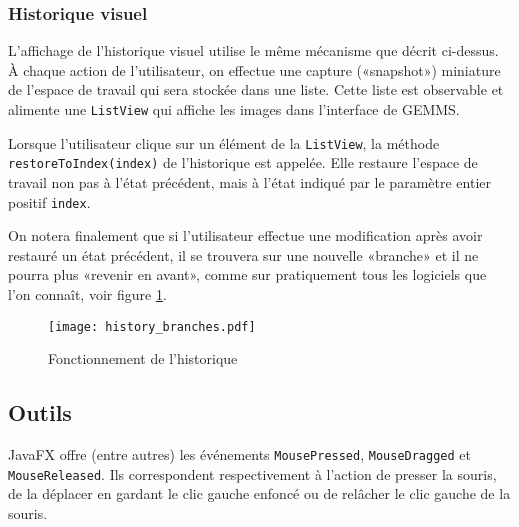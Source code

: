 \subsubsection{Historique visuel}
L'affichage de l'historique visuel utilise le même mécanisme que décrit ci-dessus. À chaque action de l'utilisateur, on effectue une capture («snapshot») miniature de l'espace de travail qui sera stockée dans une liste. Cette liste est observable et alimente une \texttt{ListView} qui affiche les images dans l'interface de GEMMS.

Lorsque l'utilisateur clique sur un élément de la \texttt{ListView}, la méthode \texttt{restoreToIndex(index)} de l'historique est appelée. Elle restaure l'espace de travail non pas à l'état précédent, mais à l'état indiqué par le paramètre entier positif \texttt{index}.

On notera finalement que si l'utilisateur effectue une modification après avoir restauré un état précédent, il se trouvera sur une nouvelle «branche» et il ne pourra plus «revenir en avant», comme sur pratiquement tous les logiciels que l'on connaît, voir figure \ref{fig:hist_branches}.

\begin{figure}[!ht]
    \caption{Fonctionnement de l'historique}
    \centering
    \texttt{[image: history\_branches.pdf]}
    \label{fig:hist_branches}
\end{figure}

\subsection{Outils}
JavaFX offre (entre autres) les événements \texttt{MousePressed}, \texttt{MouseDragged} et \texttt{MouseReleased}. Ils correspondent respectivement à l'action de presser la souris, de la déplacer en gardant le clic gauche enfoncé ou de relâcher le clic gauche de la souris.
